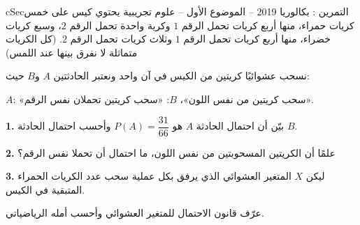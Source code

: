 \documentclass[12pt,a4paper]{article}
\newenvironment{BOX}[2]{\begin{otherlanguage}{english}\begin{arbox}{#1}{#2}}{\end{arbox}\end{otherlanguage}}
\newcounter{exo}
\newenvironment{tamrin}[1]{\stepcounter{exo}\begin{BOX}{cSec}{التمرين \theexo: #1}}{\end{BOX}}
\newcommand{\QQ}[1]{\par\smallskip\textbf{#1.} }
\begin{document}
\begin{tamrin}{بكالوريا 2019 -- الموضوع الأول -- علوم تجريبية}
يحتوي كيس على خمس كريات حمراء، منها أربع كريات تحمل الرقم $1$ وكرية واحدة تحمل الرقم $2$، وسبع كريات خضراء، منها أربع كريات تحمل الرقم $1$ وثلاث كريات تحمل الرقم $2$. (كل الكريات متماثلة لا نفرق بينها عند اللمس)

نسحب عشوائيًا كريتين من الكيس في آن واحد ونعتبر الحادثتين $A$ و$B$ حيث:

$A$: «سحب كريتين من نفس اللون»، \quad $B$: «سحب كريتين تحملان نفس الرقم».
\QQ{1} بيّن أن احتمال الحادثة $A$ هو $P(A)=\dfrac{31}{66}$ وأحسب احتمال الحادثة $B$.
\QQ{2} علمًا أن الكريتين المسحوبتين من نفس اللون، ما احتمال أن تحملا نفس الرقم؟
\QQ{3} ليكن $X$ المتغير العشوائي الذي يرفق بكل عملية سحب عدد الكريات الحمراء المتبقية في الكيس.

عرّف قانون الاحتمال للمتغير العشوائي وأحسب أمله الرياضياتي.
\end{tamrin}
\end{document}
